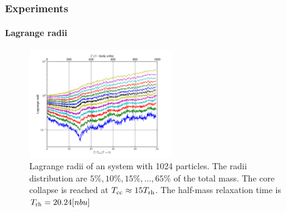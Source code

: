 \begin{frame}
    \frametitle{Experiments}
    \framesubtitle{Lagrange radii}

%
%


\begin{figure}[h!t]
    \centering
    \label{fig:lagrangeradii}
    \includegraphics[width=0.55\textwidth]{img/lagrange_radii_1024_1000t.pdf}
    \caption{Lagrange radii of an {\nbody} system with 1024 particles.
             The radii distribution are  $5\%, 10\%, 15\%, \ldots, 65\%$ of the total mass.
             The core collapse is reached at $T_{\rm cc} \approx 15 T_{\rm rh}$.
             The half-mass relaxation time is $T_{\rm rh} = 20.24 [nbu]$}
\end{figure}


\end{frame}


